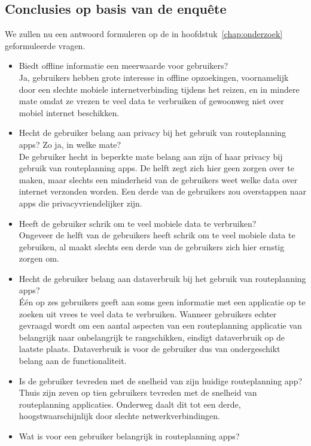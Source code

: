 \subsection{Conclusies op basis van de enquête}
We zullen nu een antwoord formuleren op de in hoofdstuk~\ref{chap:onderzoek} geformuleerde vragen.
\begin{itemize}
	\item Biedt offline informatie een meerwaarde voor gebruikers?\\
	Ja, gebruikers hebben grote interesse in offline opzoekingen, voornamelijk door een slechte mobiele internetverbinding tijdens het reizen, en in mindere mate omdat ze vrezen te veel data te verbruiken of gewoonweg niet over mobiel internet beschikken.
	\item Hecht de gebruiker belang aan privacy bij het gebruik van routeplanning apps? Zo ja, in welke mate?\\
	De gebruiker hecht in beperkte mate belang aan zijn of haar privacy bij gebruik van routeplanning apps. De helft zegt zich hier geen zorgen over te maken, maar slechts een minderheid van de gebruikers weet welke data over internet verzonden worden. Een derde van de gebruikers zou overstappen naar apps die privacyvriendelijker zijn.
	\item Heeft de gebruiker schrik om te veel mobiele data te verbruiken?\\
	Ongeveer de helft van de gebruikers heeft schrik om te veel mobiele data te gebruiken, al maakt slechts een derde van de gebruikers zich hier ernstig zorgen om.
	\item Hecht de gebruiker belang aan dataverbruik bij het gebruik van routeplanning apps?\\
	Één op zes gebruikers geeft aan soms geen informatie met een applicatie op te zoeken uit vrees te veel data te verbruiken. Wanneer gebruikers echter gevraagd wordt om een aantal aspecten van een routeplanning applicatie van belangrijk naar onbelangrijk te rangschikken, eindigt dataverbruik op de laatste plaats. Dataverbruik is voor de gebruiker dus van ondergeschikt belang aan de functionaliteit.
	\item Is de gebruiker tevreden met de snelheid van zijn huidige routeplanning app?\\
	Thuis zijn zeven op tien gebruikers tevreden met de snelheid van routeplanning applicaties. Onderweg daalt dit tot een derde, hoogstwaarschijnlijk door slechte netwerkverbindingen.
	\item Wat is voor een gebruiker belangrijk in routeplanning apps?\\

\end{itemize}

